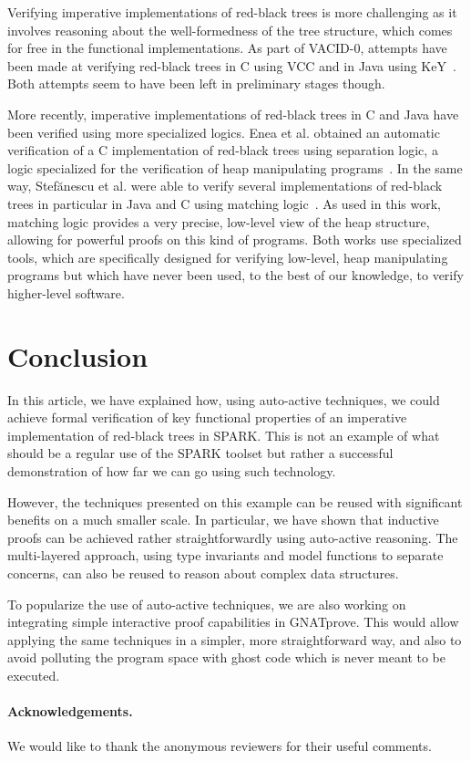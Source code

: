 \documentclass{llncs}
\begin{document}
Verifying imperative implementations of red-black trees is more challenging as it involves reasoning about the well-formedness
of the tree structure, which comes for free in the functional implementations. As part of VACID-0, attempts have been made at
verifying red-black trees in C using VCC and in Java using KeY~\cite{bruns2011specification}.
Both attempts seem to have been left in preliminary stages
though.

More recently, imperative implementations of red-black trees in C and Java have been verified using more specialized logics.
Enea et al. obtained an automatic verification of a C implementation of red-black trees using separation logic, a logic
specialized for the verification of heap manipulating programs~\cite{enea2015automated}. In the
same way, Stef{\u{a}}nescu et al. were able to verify several implementations of red-black trees in particular in Java and
C using matching logic~\cite{stefuanescu2016semantics}. As used in this work, matching logic provides a very precise,
low-level view of the heap structure, allowing for powerful proofs on this kind of programs. Both works use specialized tools,
which are specifically designed for verifying low-level, heap manipulating programs but which have never been used, to the best
of our knowledge, to verify higher-level software.

\section{Conclusion}
In this article, we have explained how, using auto-active techniques, we could achieve formal verification of key functional
properties of an imperative implementation of red-black trees in SPARK. This is not an example of what should be a regular
use of the SPARK toolset but rather a successful demonstration of how far we can go using such technology.

However, the techniques presented on this example can be reused with significant benefits on a much smaller scale. In particular, we have shown that
inductive proofs can be achieved rather straightforwardly using auto-active reasoning. The multi-layered approach, using
type invariants and model functions to separate concerns, can also be reused to reason about complex data structures.

To popularize the use of auto-active techniques, we are also working on integrating simple interactive proof capabilities
in GNATprove. This would allow applying the same techniques in a simpler, more straightforward way, and also to avoid
polluting the program space with ghost code which is never meant to be executed.

\paragraph*{Acknowledgements.}
We would like to thank the anonymous reviewers for their useful comments.




\end{document}
